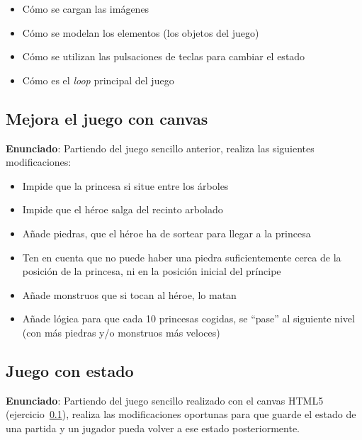 \begin{itemize}
  \item Cómo se cargan las imágenes
  \item Cómo se modelan los elementos (los objetos del juego)
  \item Cómo se utilizan las pulsaciones de teclas para cambiar el estado
  \item Cómo es el \emph{loop} principal del juego
\end{itemize}

\subsection{Mejora el juego con canvas}
\label{subsec:modifica-juego}

\textbf{Enunciado}: Partiendo del juego sencillo anterior, realiza las 
siguientes modificaciones:

\begin{itemize}
  \item Impide que la princesa si situe entre los árboles
  \item Impide que el héroe salga del recinto arbolado
  \item Añade piedras, que el héroe ha de sortear para llegar a la princesa
  \item Ten en cuenta que no puede haber una piedra suficientemente cerca de la posición de la princesa, ni en la posición inicial del príncipe
  \item Añade monstruos que si tocan al héroe, lo matan
  \item Añade lógica para que cada 10 princesas cogidas, se ``pase'' al siguiente
nivel (con más piedras y/o monstruos más veloces)
\end{itemize}

\subsection{Juego con estado}
\label{subsec:juego-con-estado}

\textbf{Enunciado}: Partiendo del juego sencillo realizado con el canvas HTML5 (ejercicio~\ref{subsec:modifica-juego}), realiza las modificaciones oportunas para que guarde el estado de una partida y un jugador pueda volver a ese estado posteriormente.


